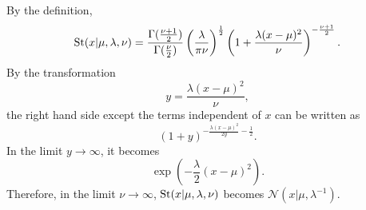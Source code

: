 \subsection{}
\label{2.47}
By the definition,
%
\begin{equation}
{\rm St}
(x | \mu, \lambda, \nu)
=
\frac{\Gamma(\frac{\nu + 1}{2})}{\Gamma(\frac{\nu}{2})}
\left(
	\frac{\lambda}{\pi \nu}
\right) ^ {\frac{1}{2}}
\left(
	1 
	+ 
	\frac{\lambda (x - \mu) ^ 2}{\nu}
\right) ^ {- \frac{\nu + 1}{2}}.
\end{equation}
%
By the transformation
%
\begin{equation}
y
=
\frac{\lambda (x - \mu) ^ 2}{\nu},
\end{equation}
%
the right hand side except the terms independent of $x$ can be written as
%
\begin{equation}
(1 + y) ^ {- \frac{\lambda (x - \mu) ^ 2}{2y} - \frac{1}{2}}.
\end{equation}
%
In the limit $y \to \infty$, it becomes
%
\begin{equation}
\exp 
\left(
	-
	\frac{\lambda}{2}
	(x - \mu) ^ 2
\right).
\end{equation}
%
Therefore, in the limit $\nu \to \infty$, ${\rm St}(x | \mu, \lambda, \nu)$ becomes $\mathcal{N} (x | \mu, \lambda ^ {- 1})$.


